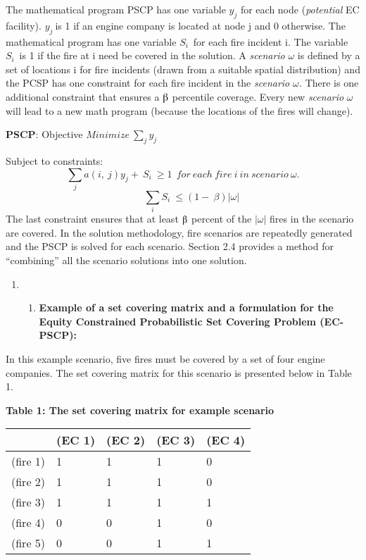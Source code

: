 \documentclass{article} %
\begin{document}
\noindent The mathematical program PSCP has one variable $y_j$\textbf{ }for each node (\textit{potential} EC facility). $y_j\ $is 1 if an engine company is located at node j and 0 otherwise.   The mathematical program has one variable $S_{i\ }$ for each fire incident i.  The variable $S_{i\ }$ is 1 if the fire at i need  be covered in the solution.  A \textit{scenario }$\omega $ is defined by a set of locations i for fire incidents (drawn from a suitable spatial distribution) and the PCSP has one constraint for each fire incident in the \textit{scenario }$\omega $\textit{.}  There is one additional constraint that ensures a $\betaup$ percentile coverage.  Every new \textit{scenario} $\omega $ will lead to a new math program (because the locations of the fires will change).   

\noindent 

\noindent \textbf{PSCP}: Objective $Minimize\ \sum_j{y_j}$

\noindent Subject to constraints:
\[\sum_j{a\left(i,\ j\right)y_j}+\ S_i\ \ge 1\ \ for\ each\ fire\ i\ in\ scenario\ \omega .\] 
\[\ \ \ \ \ \ \ \ \ \sum_i{S_i}\ \le \left(1-\ \beta \right)\left|\omega \right|\ \] 
The last constraint ensures that at least $\betaup$ percent of the $\left|\omega \right|$ fires in the scenario are covered.  In the solution methodology, fire scenarios are repeatedly generated and the PSCP is solved for each scenario.  Section 2.4 provides a method for ``combining'' all the scenario solutions into one solution.  

\begin{enumerate}
\item \begin{enumerate}
\item  \textbf{Example of a set covering matrix and a formulation for the Equity Constrained Probabilistic Set Covering Problem (EC-PSCP):}
\end{enumerate}
\end{enumerate}

\noindent In this example scenario, five fires must be covered by a set of four engine companies.   The set covering matrix for this scenario is presented below in Table 1.

\noindent 

\noindent \textbf{Table 1: The set covering matrix for example scenario}

\begin{tabular}{|p{1.1in}|p{0.8in}|p{0.8in}|p{0.8in}|p{0.8in}|} \hline 
\textbf{} & \textbf{(EC 1)} & \textbf{(EC 2)} & \textbf{(EC 3)} & \textbf{(EC 4)} \\ \hline 
(fire 1) & 1 & 1 & 1 & 0 \\ \hline 
(fire 2) & 1 & 1 & 1 & 0 \\ \hline 
(fire 3) & 1 & 1 & 1 & 1 \\ \hline 
(fire 4) & 0 & 0 & 1 & 0 \\ \hline 
(fire 5) & 0 & 0 & 1 & 1 \\ \hline 
\end{tabular}
\end{document}

